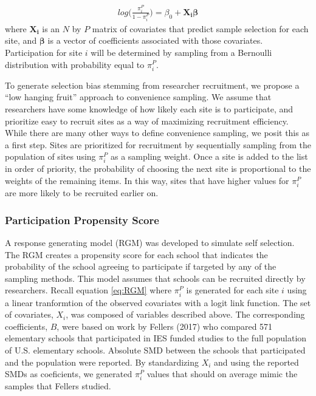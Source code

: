 \documentclass[man,floatsintext]{apa6}
\begin{document}
\begin{align} \label{eq:RGM}
  log\bigg(\frac{\pi^P_i}{1 - \pi^P_i}\bigg) = \beta_0 + \boldsymbol{X_i \beta}
\end{align}
where \(\boldsymbol{X_i}\) is an \(N\) by \(P\) matrix of covariates that predict sample selection for each site, and \(\boldsymbol{\beta}\) is a vector of coefficients associated with those covariates. Participation for site \(i\) will be determined by sampling from a Bernoulli distribution with probability equal to \(\pi^P_i\).

To generate selection bias stemming from researcher recruitment, we propose a \enquote{low hanging fruit} approach to convenience sampling. We assume that researchers have some knowledge of how likely each site is to participate, and prioritize easy to recruit sites as a way of maximizing recruitment efficiency. While there are many other ways to define convenience sampling, we posit this as a first step. Sites are prioritized for recruitment by sequentially sampling from the population of sites using \(\pi^P_i\) as a sampling weight. Once a site is added to the list in order of priority, the probability of choosing the next site is proportional to the weights of the remaining items. In this way, sites that have higher values for \(\pi^P_i\) are more likely to be recruited earlier on.

\hypertarget{participation-propensity-score}{%
\subsubsection{Participation Propensity Score}\label{participation-propensity-score}}

A response generating model (RGM) was developed to simulate self selection. The RGM creates a propensity score for each school that indicates the probability of the school agreeing to participate if targeted by any of the sampling methods. This model assumes that schools can be recruited directly by researchers. Recall equation \eqref{eq:RGM} where \(\pi^P_i\) is generated for each site \(i\) using a linear tranformtion of the observed covariates with a logit link function. The set of covariates, \(X_i\), was composed of variables described above. The corresponding coefficients, \(B\), were based on work by Fellers (2017) who compared 571 elementary schools that participated in IES funded studies to the full population of U.S. elementary schools. Absolute SMD between the schools that participated and the population were reported. By standardizing \(X_i\) and using the reported SMDs as coeficients, we generated \(\pi^P_i\) values that should on average mimic the samples that Fellers studied.
\end{document}
